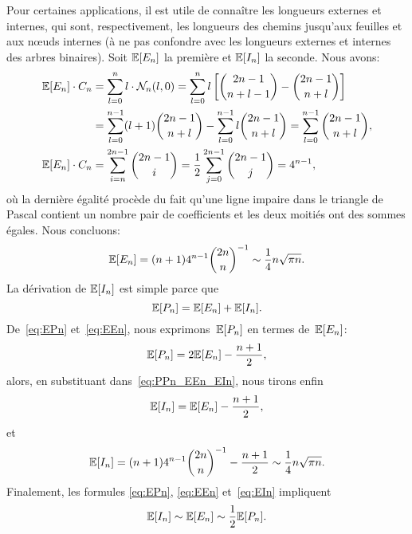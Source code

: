 Pour certaines applications, il est utile de connaître les longueurs
externes et internes, qui sont, respectivement, les longueurs des
chemins jusqu'aux feuilles et aux nœuds internes (à ne pas
confondre avec les longueurs externes et internes des arbres
binaires). Soit \(\mathbb{E}[{E_n}]\) la première et \(\mathbb{E}[{I_n}]\)
la seconde. Nous avons:
\begin{align*}
\mathbb{E}[{E_n}] \cdot C_n
  &= \sum_{l=0}^{n} l \cdot \mathcal{N}_n(l,0)
   = \sum_{l=0}^{n}l\left[\binom{2n-1}{n+l-1} -
     \binom{2n-1}{n+l}\right]\\
  &= \sum_{l=0}^{n-1}(l+1)\binom{2n-1}{n+l} -
     \sum_{l=0}^{n-1}l \binom{2n-1}{n+l}
   = \sum_{l=0}^{n-1}\binom{2n-1}{n+l},\\
\mathbb{E}[{E_n}] \cdot C_n
  &= \sum_{i=n}^{2n-1}\binom{2n-1}{i}
   = \frac{1}{2}\sum_{j=0}^{2n-1}\binom{2n-1}{j} = 4^{n-1},
\end{align*}
où la dernière égalité procède du fait qu'une ligne impaire dans le
triangle de Pascal contient un nombre pair de coefficients et les deux
moitiés ont des sommes égales. Nous concluons:
\begin{equation}
\mathbb{E}[{E_n}] = (n+1) 4^{n-1}\binom{2n}{n}^{-1} \sim
\frac{1}{4}n\sqrt{\pi n}.
\label{eq:EEn}
\end{equation}
La dérivation de \(\mathbb{E}[{I_n}]\) est simple parce que
\begin{equation}
\mathbb{E}[{P_n}] = \mathbb{E}[{E_n}] + \mathbb{E}[{I_n}].
\label{eq:PPn_EEn_EIn}
\end{equation}
De~\eqref{eq:EPn} et~\eqref{eq:EEn}, nous exprimons~\(\mathbb{E}[{P_n}]\)
en termes de~\(\mathbb{E}[{E_n}]\):
\begin{equation*}
\mathbb{E}[{P_n}] = 2 \mathbb{E}[{E_n}] - \frac{n+1}{2},
\end{equation*}
alors, en substituant dans~\eqref{eq:PPn_EEn_EIn}, nous tirons enfin
\begin{equation*}
\mathbb{E}[{I_n}] = \mathbb{E}[{E_n}] - \frac{n+1}{2},
\end{equation*}
et
\begin{equation}
\mathbb{E}[{I_n}]
  = (n+1)4^{n-1}\binom{2n}{n}^{-1} - \frac{n+1}{2} \sim
  \frac{1}{4}n\sqrt{\pi n}.
\label{eq:EIn}
\end{equation}
Finalement, les formules \eqref{eq:EPn}, \eqref{eq:EEn}
et~\eqref{eq:EIn} impliquent
\begin{equation*}
\mathbb{E}[{I_n}] \sim \mathbb{E}[{E_n}] \sim \frac{1}{2}\mathbb{E}[{P_n}].
\end{equation*}

